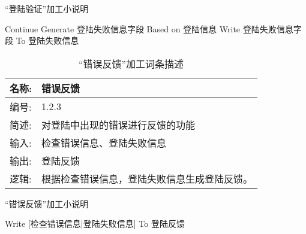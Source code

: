 \begin{algorithm}[H]
    \renewcommand{\thealgorithm}{}
    \caption{“登陆验证”加工小说明} 
    \label{alg3} 
    \begin{algorithmic}[1]
        \STATE Continue
        \ELSE
        \STATE Generate 登陆失败信息字段 Based on 登陆信息
        \STATE Write 登陆失败信息字段 To 登陆失败信息 
        \ENDIF 
    \end{algorithmic} 
\end{algorithm}

\begin{table}[H]  
\caption{“错误反馈”加工词条描述}  
\begin{center}  
    \begin{tabular}{l p{11cm}} 
        \hline
        \quad 名称:  &   错误反馈 \\
        \hline
        \quad 编号:  & 1.2.3 \\
        \hline
        \quad 简述:  & 对登陆中出现的错误进行反馈的功能 \\
        \hline
        \quad 输入:  & 检查错误信息、登陆失败信息\\
        \hline
        \quad 输出:  & 登陆反馈\\
        \hline
        \quad 逻辑:  & 根据检查错误信息，登陆失败信息生成登陆反馈。 \\
        \hline
    \end{tabular}
    \label{tab1}
\end{center}
\end{table}

\begin{algorithm}[H]
    \renewcommand{\thealgorithm}{}
    \caption{“错误反馈”加工小说明} 
    \label{alg3} 
    \begin{algorithmic}[1]
        \STATE Write [检查错误信息|登陆失败信息] To 登陆反馈
        \ENDIF
    \end{algorithmic} 
\end{algorithm}
